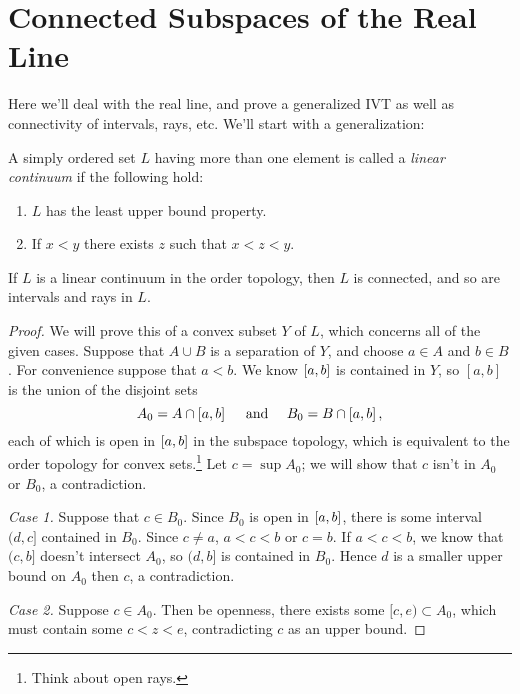 \documentclass[10pt]{report}
\begin{document}
\section{Connected Subspaces of the Real Line}
Here we'll deal with the real line, and prove a generalized IVT as well as connectivity of intervals, rays, etc.
We'll start with a generalization:
\begin{definition}
  A simply ordered set $L$ having more than one element is called a \emph{linear continuum} if the following hold:
  \begin{enumerate}[label={(\arabic*)}]
    \item $L$ has the least upper bound property.
    \item If $x<y$ there exists $z$ such that $x < z < y$.
  \end{enumerate}
\end{definition}

\begin{theorem}
  If $L$ is a linear continuum in the order topology, then $L$ is connected, and so are intervals and rays in $L$.
\end{theorem}
\begin{proof}
  We will prove this of a convex subset $Y$ of $L$, which concerns all of the given cases.
  Suppose that $A \cup B$ is a separation of $Y$, and choose $a \in A$ and $b \in B$.
  For convenience suppose that $a<b$.
  We know $\left[ a,b \right]$ is contained in $Y$, so $[a,b]$ is the union of the disjoint sets
  \[
    A_0 = A \cap \left[ a,b \right] \text{\hspace{10pt} and \hspace{10pt}} B_0 = B \cap \left[ a,b \right],
  \]
  each of which is open in $\left[ a,b \right]$ in the subspace topology, which is equivalent to the order topology for convex sets.\footnote{Think about open rays.}
  Let $c = \sup A_0$; we will show that $c$ isn't in $A_0$ or $B_0$, a contradiction.

  \emph{Case 1.} Suppose that $c \in B_0$.
  Since $B_0$ is open in $\left[ a,b \right]$, there is some interval $(d,c]$ contained in $B_0$.
  Since $c \neq a$, $a < c < b$ or $c = b$. 
  If $a<c<b$, we know that $(c,b]$ doesn't intersect $A_0$, so $(d,b]$ is contained in $B_0$.
  Hence $d$ is a smaller upper bound on $A_0$ then $c$, a contradiction.
  
  \emph{Case 2.} Suppose $c \in A_0$.
  Then be openness, there exists some $[c,e) \subset A_0$, which must contain some $c < z < e$, contradicting $c$ as an upper bound.
\end{proof}
\end{document}
